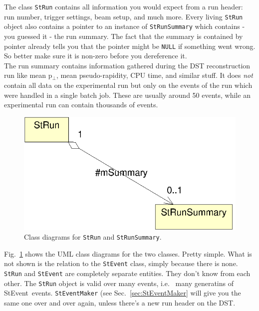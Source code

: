 \documentclass[twoside]{article}
\newcommand{\StEvent}{\textsf{StEvent}}
\begin{document}
The class \texttt{StRun} contains all information you would expect
from a run header: run number, trigger settings, beam setup, and much
more. Every living \texttt{StRun} object also contains a pointer to an
instance of \texttt{StRunSummary} which contains - you guessed it -
the run summary.  The fact that the summary is contained by pointer
already tells you that the pointer might be \texttt{NULL} if something
went wrong. So better make sure it is non-zero before you dereference
it.\\
The run summary contains information gathered during the DST
reconstruction run like mean p$_\perp$, mean pseudo-rapidity, CPU
time, and similar stuff.  It does \emph{not} contain all data on the
experimental run but only on the events of the run which were handled
in a single batch job. These are usually around 50 events, while an
experimental run can contain thousands of events.
\begin{figure}[htb]
    \begin{center}
        \includegraphics{run.eps}
        \caption{Class diagrams for \texttt{StRun} and \texttt{StRunSummary}.}
        \label{fig:umlRun}
    \end{center}
\end{figure}
Fig.~\ref{fig:umlRun} shows the UML class diagrams for the two
classes. Pretty simple.  What is not shown is the relation to the
\texttt{StEvent} class, simply because there is none.  \texttt{StRun}
and \texttt{StEvent} are completely separate entities. They don't know
from each other.  The \texttt{StRun} object is valid over many events,
i.e.~ many generatins of \StEvent\ events.  \texttt{StEventMaker} (see
Sec.~\ref{sec:StEventMaker} will give you the same one over and over
again, unless there's a new run header on the DST.
\end{document}

